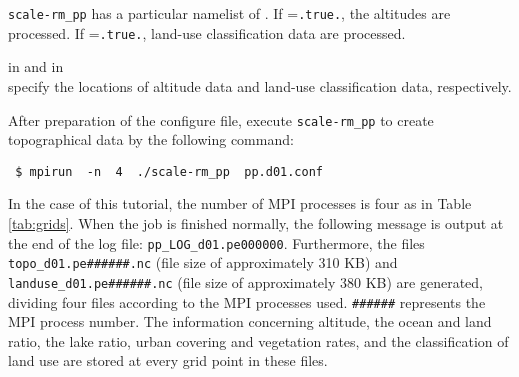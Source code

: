 \verb|scale-rm_pp| has a particular namelist of .
If =\verb|.true.|, the altitudes are processed.
If =\verb|.true.|, land-use classification data are processed.

 in 
and  in\\  specify the locations of altitude data and land-use classification data, respectively.

After preparation of the configure file,
execute \verb|scale-rm_pp| to create topographical data by the following command:
\begin{verbatim}
 $ mpirun  -n  4  ./scale-rm_pp  pp.d01.conf
\end{verbatim}
In the case of this tutorial, the number of MPI processes is four as in Table \ref{tab:grids}.
When the job is finished normally,
the following message is output at the end of the log file: \verb|pp_LOG_d01.pe000000|.
Furthermore, the files \verb|topo_d01.pe######.nc| (file size of approximately 310 KB)  and\\
\verb|landuse_d01.pe######.nc| (file size of approximately 380 KB)  are generated,
dividing four files according to the MPI processes used.
\verb|######| represents the MPI process number.
The information concerning altitude, the ocean and land ratio, the lake ratio, urban covering and vegetation rates, and the classification of land use are stored at every grid point in these files.

